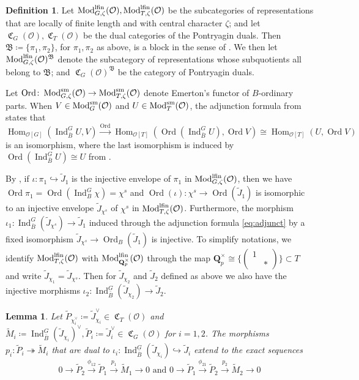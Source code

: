 \documentclass[leqno]{amsart}
\newtheorem{lem}[thm]{Lemma}
\theoremstyle{definition}
\newtheorem{defn}[thm]{Definition}
\theoremstyle{remark}
\newcommand{\smat}[1]{\left(\begin{smallmatrix} #1 \end{smallmatrix}\right)}
\newcommand{\oo}{\mathcal{O}}
\newcommand{\Qp}{\mathbf{Q}_p}
\DeclareMathOperator{\Hom}{Hom}
\DeclareMathOperator{\Ind}{Ind}
\DeclareMathOperator{\Mod}{\textnormal{Mod}}
\DeclareMathOperator{\fC}{\mathfrak{C}} %
\DeclareMathOperator{\Ord}{Ord} %
\newcommand{\B}{\mathfrak B} %
\newcommand{\sm}{\textnormal{sm}}
\newcommand{\lfin}{\textnormal{lfin}}
\begin{document}
\begin{defn}\label{def:block}
Let $\Mod^{\lfin}_{G,\zeta}(\oo), \Mod^{\lfin}_{T,\zeta}(\oo)$
be the subcategories
of representations that are 
locally of finite length 
and with central character $\zeta$;
and let $\fC_G(\oo), \fC_T(\oo)$
be the dual categories
of the Pontryagin duals.
Then $\B\coloneqq\{\pi_1,\pi_2\}$,
for $\pi_1,\pi_2$ as above, is a block 
in the sense of \cite[\S 5]{pask}.
We then let $\Mod^{\lfin}_{G,\zeta}(\oo)^\B$
denote the subcategory
of representations whose subquotients
all belong to $\B$;
and $\fC_G(\oo)^\B$
be the category of Pontryagin duals.
\end{defn}

Let $\Ord\colon \Mod_{G,\zeta}^{\sm}(\oo)
\to \Mod_{T,\zeta}^{\sm}(\oo)$
denote Emerton's functor of $B$-ordinary parts.
When $V\in \Mod^{\sm}_G(\oo)$ and
$U\in \Mod^{\sm}_T(\oo)$,
the adjunction formula
from \cite[Thm 4.4.6]{emeI} states that
\begin{equation}\label{eq:adjunct}
	\Hom_{\oo[G]}(\Ind_{\bar{B}}^GU,V)
	\xrightarrow{\Ord}
	\Hom_{\oo[T]}(\Ord(\Ind_{\bar{B}}^GU),\Ord V)
	\cong
	\Hom_{\oo[T]}(U,\Ord V)
\end{equation}
is an isomorphism, where the last isomorphism
is induced by $\Ord(\Ind_{\bar{B}}^GU)\cong U$
from  \cite[Prop 4.3.4]{emeI}.

By \cite[Prop 7.1]{pask},
if $\iota\colon \pi_1\hookrightarrow \tilde{J}_1$
is the injective envelope of $\pi_1$
in $\Mod^{\lfin}_{G,\zeta}(\oo)$,
then we have $\Ord\pi_1=\Ord(\Ind_B^G\chi)=\chi^s$
and $\Ord(\iota)\colon \chi^s \to \Ord(\tilde{J}_1)$
is isomorphic to an injective envelope
$\tilde{J}_{\chi^s}$ of $\chi^s$
in $\Mod^{\lfin}_{T,\zeta}(\oo)$.
Furthermore, the morphism 
$\iota_1\colon \Ind_{\bar{B}}^G(\tilde{J}_{\chi^s})\to
\tilde{J}_1$
induced through the adjunction formula \eqref{eq:adjunct}
by a fixed isomorphism
$\tilde{J}_{\chi^s}\to \Ord_B(\tilde{J}_1)$
is injective.
To simplify notations,
we identify $\Mod^{\lfin}_{T,\zeta}(\oo)$
with $\Mod^{\lfin}_{\Qp^\times}(\oo)$ through 
the map $\Qp^\times\cong \{\smat{1&\\&*}\}\subset T$
and write $\tilde{J}_{\chi_1}=\tilde{J}_{\chi^s}$.
Then for $ \tilde{J}_{\chi_2}$
and $ \tilde{J}_2$ defined as above
we also have the injective morphisms
$\iota_2\colon \Ind_{\bar{B}}^G(\tilde{J}_{\chi_2})\to
\tilde{J}_2$.


\begin{lem}\cite[Cor 7.7]{pask}
\label{lem:proj_enve}
Let $\tilde{P}_{\chi_i^\vee}\coloneqq \tilde{J}_{\chi_i}^\vee
\in\fC_T(\oo)$ and
$\tilde{M}_i\coloneqq 
\Ind_{\bar{B}}^G(\tilde{J}_{\chi_i})^\vee,
\tilde{P}_i\coloneqq \tilde{J}_i^\vee\in\fC_G(\oo)$
for $i=1,2$.
The morphisms
$p_i\colon \tilde{P}_i\twoheadrightarrow \tilde{M}_i$
that are dual to
$\iota_i\colon 
\Ind_{\bar{B}}^G(\tilde{J}_{\chi_i})\hookrightarrow 
\tilde{J}_i$ 
extend to the exact sequences
\begin{equation}\label{eq:exact_PPM}
	0\to \tilde{P}_{2}\xrightarrow{\phi_{12}} 
	\tilde{P}_{1}\xrightarrow{p_1} \tilde{M}_1\to 0 
	\text{ and }
	0\to \tilde{P}_{1}\xrightarrow{\phi_{21}} 
	\tilde{P}_{2}\xrightarrow{p_2} \tilde{M}_2\to 0
\end{equation}
\end{lem}
\end{document}
